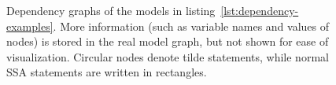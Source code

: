 \begin{figure}[p]
  \centering
  \caption{Dependency graphs of the models in listing~\ref{lst:dependency-examples}.  More
    information (such as variable names and values of nodes) is stored in the real model graph, but
    not shown for ease of visualization.  Circular nodes denote tilde statements, while normal SSA
    statements are written in rectangles.}
  \label{fig:geom-deps}
\end{figure}
